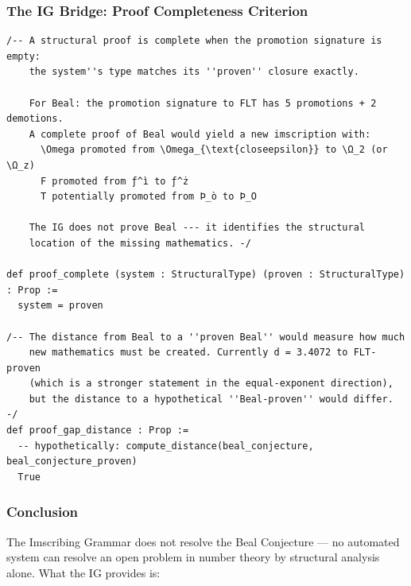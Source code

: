 \documentclass[12pt,a4paper]{article}
\begin{document}
\subsubsection{The IG Bridge: Proof Completeness Criterion}

\begin{lstlisting}[language=lean4]
/-- A structural proof is complete when the promotion signature is empty:
    the system''s type matches its ''proven'' closure exactly. 

    For Beal: the promotion signature to FLT has 5 promotions + 2 demotions.
    A complete proof of Beal would yield a new imscription with:
      \Omega promoted from \Omega_{\text{closeepsilon}} to \Ω_2 (or \Ω_z)
      F promoted from ƒ^ì to ƒ^ż
      T potentially promoted from Þ_ò to Þ_O
    
    The IG does not prove Beal --- it identifies the structural
    location of the missing mathematics. -/

def proof_complete (system : StructuralType) (proven : StructuralType) : Prop :=
  system = proven

/-- The distance from Beal to a ''proven Beal'' would measure how much
    new mathematics must be created. Currently d = 3.4072 to FLT-proven
    (which is a stronger statement in the equal-exponent direction),
    but the distance to a hypothetical ''Beal-proven'' would differ. -/
def proof_gap_distance : Prop :=
  -- hypothetically: compute_distance(beal_conjecture, beal_conjecture_proven)
  True
\end{lstlisting}

\subsubsection{Conclusion}

The Imscribing Grammar does not resolve the Beal Conjecture --- no automated system can resolve an open problem in number theory by structural analysis alone. What the IG provides is:
\end{document}
